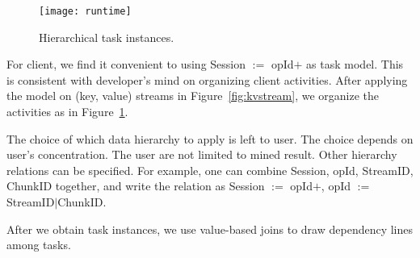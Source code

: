 \begin{figure}
\centering
\texttt{[image: runtime]}
\caption{Hierarchical task instances.}
\label{fig:runtime}
\end{figure}

For \cosmos client, we find it convenient to using Session
$:=$ opId$+$ as task model. This is consistent with
developer's mind on organizing client activities. After
applying the model on (key, value) streams in
Figure~\ref{fig:kvstream}, we organize the activities as in
Figure~\ref{fig:runtime}.

The choice of which data hierarchy to apply is left to user.
The choice depends on user's concentration. The user are not
limited to mined result. Other hierarchy relations can be
specified. For example, one can combine Session, opId,
StreamID, ChunkID together, and write the relation as
Session $:=$ opId$+$, opId $:=$ StreamID$|$ChunkID.

After we obtain task instances, we use value-based joins to
draw dependency lines among tasks.

